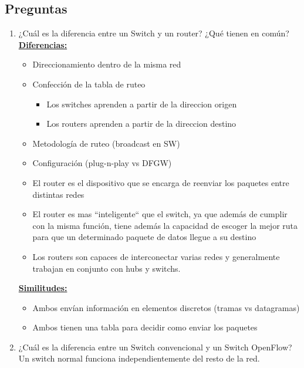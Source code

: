 \subsection{Preguntas}	
	\begin{enumerate}
		\item ¿Cuál es la diferencia entre un Switch y un router? ¿Qué tienen en común?
			\underline{\textbf{Diferencias:}}
				\begin{itemize}
					\item Direccionamiento dentro de la misma red
					\item Confección de la tabla de ruteo
						\begin{itemize}
							\item Los switches aprenden a partir de la direccion origen
							\item Los routers aprenden a partir de la direccion destino
						\end{itemize}
					\item Metodología de ruteo (broadcast en SW)
					\item Configuración (plug-n-play vs DFGW)
					\item El router es el dispositivo que se encarga de reenviar los paquetes entre distintas redes
					\item El router es mas  ``inteligente`` que el switch, ya que además de cumplir con la misma función, 						tiene además la capacidad de escoger la mejor ruta para que un determinado paquete de datos llegue a su 					destino
					\item Los routers son capaces de interconectar varias redes y generalmente trabajan en conjunto con 						hubs y switchs.
				\end{itemize}
			\underline{\textbf{Similitudes:}}
				\begin{itemize}
					\item Ambos envían información en elementos discretos (tramas vs datagramas)
					\item Ambos tienen una tabla para decidir como enviar los paquetes
				\end{itemize}
		\item ¿Cuál es la diferencia entre un Switch convencional y un Switch OpenFlow?\\
			Un switch normal funciona independientemente del resto de la red.


\end{enumerate}
